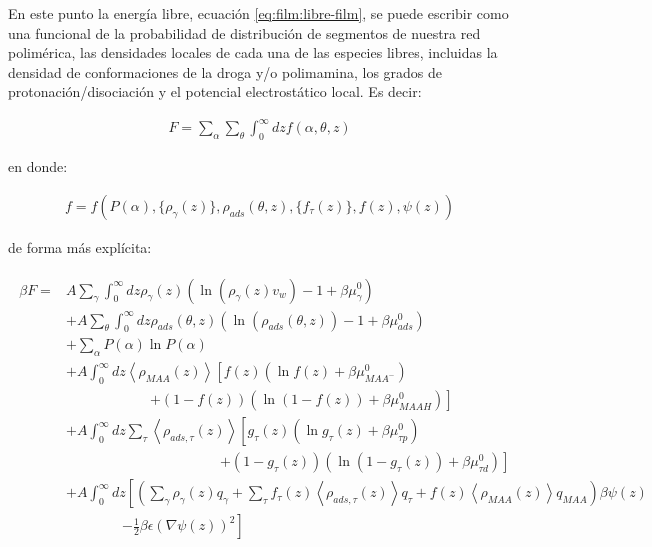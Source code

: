 En este punto la energ\'ia libre, ecuaci\'on \ref{eq:film:libre-film}, se puede escribir como una funcional de la probabilidad de distribuci\'on de segmentos de nuestra red polim\'erica, las densidades locales de cada una de las especies libres, incluidas la densidad de conformaciones de la droga y/o polimamina, los grados de protonaci\'on/disociaci\'on y el potencial electrost\'atico local. Es decir:

\begin{align}
	F = \sum_\alpha \sum_\theta \int_0^\infty dz f(\alpha, \theta,z)
\end{align}

\noindent en donde:

\begin{align}
	 f=  f \left( P(\alpha), \{\rho_\gamma(z)\},\rho_{ads}(\theta, z), \{f_\tau(z)\}, f(z), \psi(z)  \right)
	 \label{eq:film:funcionales}
 \end{align}

\noindent de forma m\'as expl\'icita:

\begin{align}
	\begin{aligned}
		\beta F=  & A\sum_{\gamma}\int_0^\infty{dz\rho_\gamma(z)\left(\ln \left(\rho_\gamma (z)v_w\right) -1 + \beta\mu^0_\gamma\right)} \\
		&+ A\sum_{\theta}\int_0^\infty{dz\rho_{ads}(\theta,z)\left(\ln \left(\rho_{ads}(\theta,z)\right) -1 + \beta\mu^0_{ads} \right)} \\
		&+ \sum_\alpha{P(\alpha)\ln P(\alpha)} \\
		& + A\int_0^\infty dz \left<\rho_{MAA}(z)\right> \left[f(z)(\ln f(z)+ \beta\mu^0_{MAA^-})\right.\\
		& \qquad\qquad\qquad \left.+(1-f(z))\left(\ln (1-f(z))+\beta\mu^0_{MAAH}\right)\right] \\
		& + A\int_0^\infty dz \sum_\tau \left<\rho_{ads,\tau}(z)\right> \left[g_\tau(z)(\ln g_\tau(z)+ \beta\mu^0_{\tau p})\right.\\
		&\qquad \qquad \qquad\qquad \qquad\quad \left.+(1-g_\tau(z))(\ln (1-g_\tau(z))+\beta\mu^0_{\tau d})\right]   \\
		 & +A\int_0^\infty dz \left[\left(\sum_{\gamma } {\rho_\gamma(z) q_\gamma + \sum_\tau{f_\tau(z) \left<\rho_{ads,\tau}(z)\right> q_\tau} +  f(z)\left<\rho_{MAA}(z)\right>q_{MAA}}\right)\beta\psi(z) \right. \\ & \qquad \qquad \left.-\frac{1}{2}\beta\epsilon(\nabla\psi(z))^2 \right]
		\end{aligned}
\end{align}


